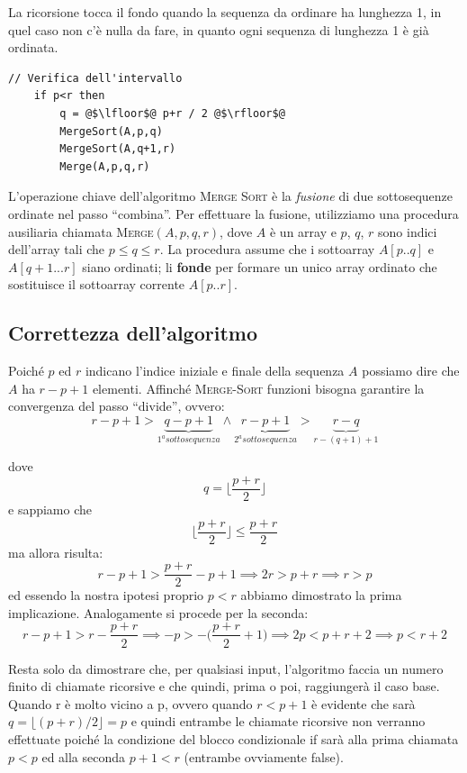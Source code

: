 La ricorsione tocca il fondo quando la sequenza da ordinare ha lunghezza 1, in quel caso non c'è nulla da fare, in quanto ogni sequenza di lunghezza 1 è già ordinata.
\begin{lstlisting}[caption={\textsc{MergeSort}(A,p,r)},language=asd,label=alg:mergesort]
	// Verifica dell'intervallo
	if p<r then
		q = @$\lfloor$@ p+r / 2 @$\rfloor$@
		MergeSort(A,p,q)
		MergeSort(A,q+1,r)
		Merge(A,p,q,r)
\end{lstlisting}


L'operazione chiave dell'algoritmo \textsc{Merge Sort} è la \textit{fusione} di due sottosequenze ordinate nel passo ``combina''. Per effettuare la fusione, utilizziamo una procedura ausiliaria chiamata \textsc{Merge}$(A,p,q,r)$, dove $A$ è un array e $p$, $q$, $r$ sono indici dell'array tali che $p \leq q \leq r$. La procedura assume che i sottoarray $A[p..q]$ e $A[q+1...r]$ siano ordinati; li \textbf{fonde} per formare un unico array ordinato che sostituisce il sottoarray corrente $A[p..r]$.

\subsection{Correttezza dell'algoritmo}
Poiché $p$ ed $r$ indicano l'indice iniziale e finale della sequenza $A$ possiamo dire che $A$ ha $r-p+1$ elementi. Affinché \textsc{Merge-Sort} funzioni bisogna garantire la convergenza del passo ``divide'', ovvero:
\begin{displaymath}
	r-p+1>\underbrace{q-p+1}_{1^{a} sottosequenza} \wedge \underbrace{r-p+1}_{2^{a} sottosequenza} > \underbrace{r-q}_{r-(q+1)+1}
\end{displaymath}

dove $$q=\bigl \lfloor \frac{p+r}{2}\bigl \rfloor$$
e sappiamo che $$\bigl \lfloor\frac{p+r}{2}\bigl \rfloor \leq \frac{p+r}{2}$$
ma allora risulta:
\begin{displaymath}
	r-p+1 > \frac{p+r}{2}-p+1 \implies 2r>p+r \implies r>p
\end{displaymath}
ed essendo la nostra ipotesi proprio $p<r$ abbiamo dimostrato la prima implicazione. Analogamente si procede per la seconda:
\begin{displaymath}
	r-p+1>r-\frac{p+r}{2} \implies -p > -\bigl ( \frac{p+r}{2}+1 \bigl) \implies 2p<p+r+2 \implies p<r+2
\end{displaymath}

Resta solo da dimostrare che, per qualsiasi input, l'algoritmo faccia un numero finito di chiamate ricorsive e che quindi, prima o poi, raggiungerà il caso base. Quando r è molto vicino a p, ovvero quando $r<p+1$ è evidente che sarà $q=\lfloor (p+r)/2 \rfloor = p$ e quindi entrambe le chiamate ricorsive non verranno effettuate poiché la condizione del blocco condizionale if sarà alla prima chiamata $p<p$ ed alla seconda $p+1<r$ (entrambe ovviamente false).

